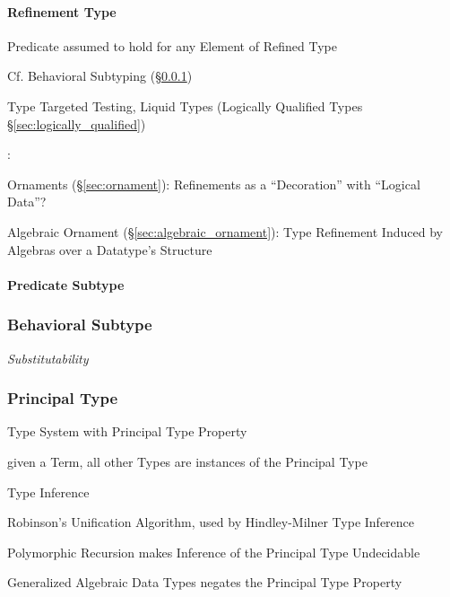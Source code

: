 \paragraph{Refinement Type}\label{sec:refinement_type}\hfill

Predicate assumed to hold for any Element of Refined Type

\fist Cf. Behavioral Subtyping (\S\ref{sec:behavioral_subtype})

Type Targeted Testing, Liquid Types (Logically Qualified Types
\S\ref{sec:logically_qualified})


\asterism


\cite{mcbride13}:

Ornaments (\S\ref{sec:ornament}): Refinements as a ``Decoration'' with
``Logical Data''? %

Algebraic Ornament (\S\ref{sec:algebraic_ornament}): Type Refinement
Induced by Algebras over a Datatype's Structure



\paragraph{Predicate Subtype}\label{sec:predicate_subtype}\hfill



\subsubsection{Behavioral Subtype}\label{sec:behavioral_subtype}

\emph{Substitutability}



\subsubsection{Principal Type}\label{sec:principal_type}

Type System with Principal Type Property

given a Term, all other Types are instances of the Principal Type

Type Inference

Robinson's Unification Algorithm, used by Hindley-Milner Type
Inference

Polymorphic Recursion makes Inference of the Principal Type Undecidable

Generalized Algebraic Data Types negates the Principal Type Property



